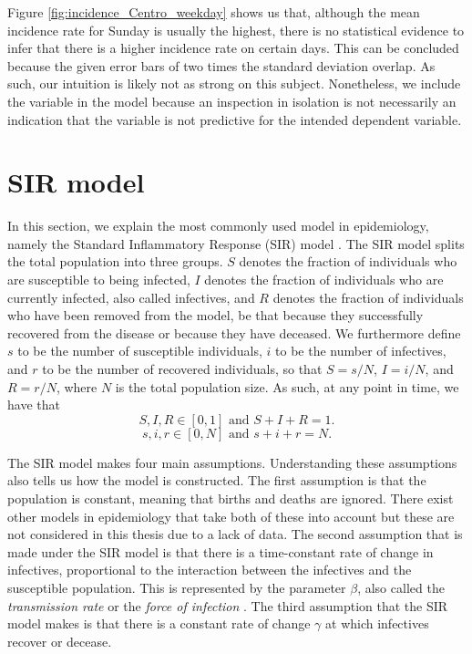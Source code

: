 \documentclass[12pt]{article}
\begin{document}
	Figure \ref{fig:incidence_Centro_weekday} shows us that, although the mean incidence rate for Sunday is usually the highest, there is no statistical evidence to infer that there is a higher incidence rate on certain days. This can be concluded because the given error bars of two times the standard deviation overlap. As such, our intuition is likely not as strong on this subject. Nonetheless, we include the variable in the model because an inspection in isolation is not necessarily an indication that the variable is not predictive for the intended dependent variable.
	
	\section{SIR model}\label{sec:sir_model}
	In this section, we explain the most commonly used model in epidemiology, namely the Standard Inflammatory Response (SIR) model \parencite{kermack1927contribution, anderson1992infectious}. The SIR model splits the total population into three groups. $S$ denotes the fraction of individuals who are susceptible to being infected, $I$ denotes the fraction of individuals who are currently infected, also called infectives, and $R$ denotes the fraction of individuals who have been removed from the model, be that because they successfully recovered from the disease or because they have deceased. We furthermore define $s$ to be the number of susceptible individuals, $i$ to be the number of infectives, and $r$ to be the number of recovered individuals, so that $S = s/N$, $I = i/N$, and $R = r/N$, where $N$ is the total population size. As such, at any point in time, we have that
	    \[S,I,R \in [0,1] \text{ and } S+I+R=1.\]
	    \[s,i,r \in [0,N] \text{ and } s+i+r=N.\]
	
	The SIR model makes four main assumptions. Understanding these assumptions also tells us how the model is constructed. The first assumption is that the population is constant, meaning that births and deaths are ignored. There exist other models in epidemiology that take both of these into account but these are not considered in this thesis due to a lack of data. The second assumption that is made under the SIR model is that there is a time-constant rate of change in infectives, proportional to the interaction between the infectives and the susceptible population. This is represented by the parameter $\beta$, also called the \textit{transmission rate} or the \textit{force of infection} \parencite{keeling2011modeling}. The third assumption that the SIR model makes is that there is a constant rate of change $\gamma$ at which infectives recover or decease. \\
	
\end{document}
